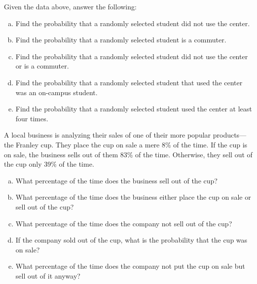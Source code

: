 \documentclass[11pt,letterpaper]{article}
\begin{document}
Given the data above, answer the following:
	\begin{enumerate}[(a)]
	\item Find the probability that a randomly selected student did not use the center.
	\item Find the probability that a randomly selected student is a commuter. 
	\item Find the probability that a randomly selected student did not use the center or is a commuter. 
	\item Find the probability that a randomly selected student that used the center was an on-campus student.
	\item Find the probability that a randomly selected student used the center at least four times. 
	\end{enumerate}



\newpage



 A local business is analyzing their sales of one of their more popular products---the Franley cup. They place the cup on sale a mere 8\% of the time. If the cup is on sale, the business sells out of them 83\% of the time. Otherwise, they sell out of the cup only 39\% of the time. 
	\begin{enumerate}[(a)]
	\item What percentage of the time does the business sell out of the cup?
	\item What percentage of the time does the business either place the cup on sale or sell out of the cup?
	\item What percentage of the time does the company not sell out of the cup?
	\item If the company sold out of the cup, what is the probability that the cup was on sale?
	\item What percentage of the time does the company not put the cup on sale but sell out of it anyway?
	\end{enumerate}
\end{document}
